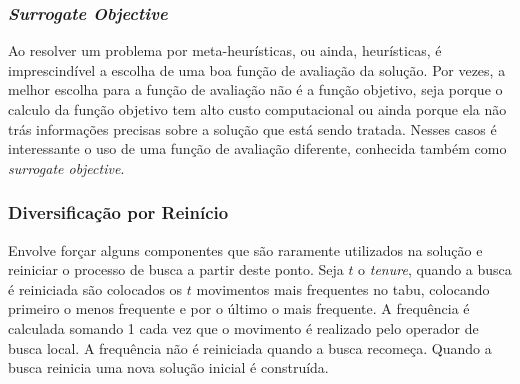 \documentclass[12pt,a4paper]{article}
\begin{document}
    \subsubsection{\it Surrogate Objective} 

        Ao resolver um problema por meta-heurísticas, ou ainda, heurísticas, é imprescindível a escolha de uma boa função de avaliação da solução. Por vezes, a melhor escolha para a função de
        avaliação não é a função objetivo, seja porque o calculo da função objetivo tem alto custo computacional ou ainda porque ela não trás informações precisas sobre a solução que está sendo
        tratada. Nesses casos é interessante o uso de uma função de avaliação diferente, conhecida também como {\it surrogate objective}.





    \subsubsection{Diversificação por Reinício}

        Envolve forçar alguns componentes que são raramente utilizados na solução e reiniciar o processo de busca a partir deste ponto.  Seja $t$ o \textit{tenure}, quando a busca é
        reiniciada são colocados os $t$ movimentos mais frequentes no tabu, colocando primeiro o menos frequente e por o último o mais frequente. A frequência é calculada somando 1 cada vez
        que o movimento é realizado pelo operador de busca local. A frequência não é reiniciada quando a busca recomeça. Quando a busca reinicia uma nova solução inicial é construída.




\printbibliography
\end{document}
